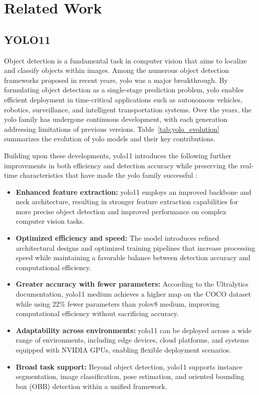 \chapter{Related Work}
\label{ch:related-work}

\section{YOLO11}
\label{related_work_yolo11}

Object detection is a fundamental task in computer vision that aims to localize and classify objects within images. Among the numerous object detection frameworks proposed in recent years, \acrfull{yolo} was a major breakthrough. By formulating object detection as a single-stage prediction problem, \acrshort{yolo} enables efficient deployment in time-critical applications such as autonomous vehicles, robotics, surveillance, and intelligent transportation systems. Over the years, the \acrshort{yolo} family has undergone continuous development, with each generation addressing limitations of previous versions. Table~\ref{tab:yolo_evolution} summarizes the evolution of \acrshort{yolo} models and their key contributions. \cite{yolov11}

Building upon these developments, \acrshort{yolo}11 introduces the following further improvements in both efficiency and detection accuracy while preserving the real-time characteristics that have made the \acrshort{yolo} family successful \cite{yolo11_ultralytics}:
\begin{itemize}
\item \textbf{Enhanced feature extraction:} \acrshort{yolo}11 employs an improved backbone and neck architecture, resulting in stronger feature extraction capabilities for more precise object detection and improved performance on complex computer vision tasks.
\item \textbf{Optimized efficiency and speed:} The model introduces refined architectural designs and optimized training pipelines that increase processing speed while maintaining a favorable balance between detection accuracy and computational efficiency.
\item \textbf{Greater accuracy with fewer parameters:} According to the Ultralytics documentation, \acrshort{yolo}11 medium achieves a higher \acrshort{map} on the COCO dataset while using 22\% fewer parameters than \acrshort{yolo}v8 medium, improving computational efficiency without sacrificing accuracy.
\item \textbf{Adaptability across environments:} \acrshort{yolo}11 can be deployed across a wide range of environments, including edge devices, cloud platforms, and systems equipped with NVIDIA GPUs, enabling flexible deployment scenarios.
\item \textbf{Broad task support:} Beyond object detection, \acrshort{yolo}11 supports instance segmentation, image classification, pose estimation, and oriented bounding box (OBB) detection within a unified framework.
\end{itemize}

